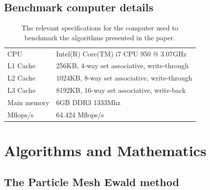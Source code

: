\documentclass[pdftex,twoside,a4paper]{report}
\newcommand{\pmem}{Particle Mesh Ewald method}
\begin{document}
\section{Benchmark computer details}
\begin{table}[h]

    \begin{tabular}{l|l}
        CPU         & Intel(R) Core(TM) i7 CPU 950  @ 3.07GHz        \\ 
        L1 Cache                               & 256KB, 4-way set associative, write-through             \\ 
        L2 Cache                               & 1024KB, 8-way set associative, write-through \\
        L3 Cache                               & 8192KB, 16-way set associative, write-back \\ 
        Main memory                            & 6GB DDR3 1333Mhz\\ 
        Mflops/s                               & 64.424 Mflops/s
    \end{tabular}
    \caption{The relevant specifications for the computer used to benchmark the algorithms presented in the paper.}
\end{table}

\chapter{Algorithms and Mathematics}
\label{ap:math}
\section{The \pmem{}}
\end{document}
